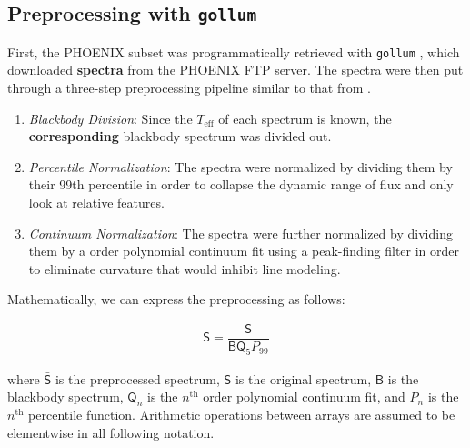 \documentclass[twocolumn, linenumbers]{aastex631}
\begin{document}
\subsection{Preprocessing with \texttt{gollum}}
First, the PHOENIX subset was programmatically retrieved with \texttt{gollum} \textbf{\citep{gollum}}, which downloaded \textbf{spectra} from the PHOENIX FTP server. The spectra were then put through a
three-step preprocessing pipeline similar to that from \citealt{blase}.
\begin{enumerate}
    \item \textit{Blackbody Division}: Since the $T_{\mathrm{eff}}$ of each spectrum is known, the \textbf{corresponding} blackbody spectrum was divided out.
    \item \textit{Percentile Normalization}: The spectra were normalized by dividing them by their 99th percentile in order to collapse the dynamic range of flux and only look at relative features.
    \item \textit{Continuum Normalization}: The spectra were further normalized by dividing them by a  order polynomial continuum fit using a peak-finding filter in order to eliminate curvature that would inhibit line modeling.
\end{enumerate}
Mathematically, we can express the preprocessing as follows:
\begin{linenomath*}
\begin{gather}
    \mathsf{\bar{S}} = \dfrac{\mathsf{S}}{\mathsf{B}\mathsf{Q}_5P_{99}}
\end{gather}
\end{linenomath*}
where $\mathsf{\bar{S}}$ is the preprocessed spectrum, $\mathsf{S}$ is the original spectrum,  $\mathsf{B}$ is the blackbody spectrum, $\mathsf{Q}_n$ is the $n^\mathrm{th}$ order polynomial continuum fit, and $P_n$ is the $n^\mathrm{th}$ percentile function.
Arithmetic operations between arrays are assumed to be elementwise in all following notation.
\end{document}
